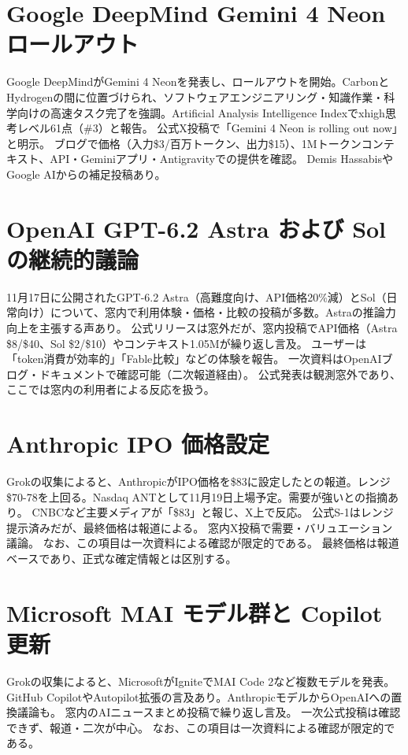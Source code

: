 \section{Google DeepMind Gemini 4 Neon ロールアウト}
Google DeepMindがGemini 4 Neonを発表し、ロールアウトを開始。CarbonとHydrogenの間に位置づけられ、ソフトウェアエンジニアリング・知識作業・科学向けの高速タスク完了を強調。Artificial Analysis Intelligence Indexでxhigh思考レベル61点（\#3）と報告。 公式X投稿で「Gemini 4 Neon is rolling out now」と明示。 ブログで価格（入力\$3/百万トークン、出力\$15）、1Mトークンコンテキスト、API・Geminiアプリ・Antigravityでの提供を確認。 Demis HassabisやGoogle AIからの補足投稿あり。

\section{OpenAI GPT-6.2 Astra および Sol の継続的議論}
11月17日に公開されたGPT-6.2 Astra（高難度向け、API価格20\%減）とSol（日常向け）について、窓内で利用体験・価格・比較の投稿が多数。Astraの推論力向上を主張する声あり。 公式リリースは窓外だが、窓内投稿でAPI価格（Astra \$8/\$40、Sol \$2/\$10）やコンテキスト1.05Mが繰り返し言及。 ユーザーは「token消費が効率的」「Fable比較」などの体験を報告。 一次資料はOpenAIブログ・ドキュメントで確認可能（二次報道経由）。 公式発表は観測窓外であり、ここでは窓内の利用者による反応を扱う。

\section{Anthropic IPO 価格設定}
Grokの収集によると、AnthropicがIPO価格を\$83に設定したとの報道。レンジ\$70-78を上回る。Nasdaq ANTとして11月19日上場予定。需要が強いとの指摘あり。 CNBCなど主要メディアが「\$83」と報じ、X上で反応。 公式S-1はレンジ提示済みだが、最終価格は報道による。 窓内X投稿で需要・バリュエーション議論。 なお、この項目は一次資料による確認が限定的である。 最終価格は報道ベースであり、正式な確定情報とは区別する。

\section{Microsoft MAI モデル群と Copilot 更新}
Grokの収集によると、MicrosoftがIgniteでMAI Code 2など複数モデルを発表。GitHub CopilotやAutopilot拡張の言及あり。AnthropicモデルからOpenAIへの置換議論も。 窓内のAIニュースまとめ投稿で繰り返し言及。 一次公式投稿は確認できず、報道・二次が中心。 なお、この項目は一次資料による確認が限定的である。

